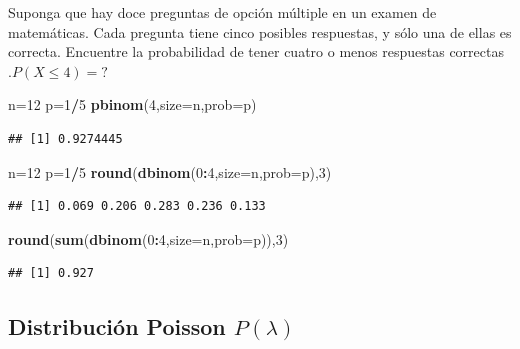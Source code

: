 \documentclass[
  ignorenonframetext,
]{beamer}
\newenvironment{Shaded}{\begin{snugshade}}{\end{snugshade}}
\newcommand{\DataTypeTok}[1]{\textcolor[rgb]{0.13,0.29,0.53}{#1}}
\newcommand{\DecValTok}[1]{\textcolor[rgb]{0.00,0.00,0.81}{#1}}
\newcommand{\KeywordTok}[1]{\textcolor[rgb]{0.13,0.29,0.53}{\textbf{#1}}}
\newcommand{\NormalTok}[1]{#1}
\newcommand{\OperatorTok}[1]{\textcolor[rgb]{0.81,0.36,0.00}{\textbf{#1}}}
\begin{document}
\begin{frame}[fragile]{}

\justifying Suponga que hay doce preguntas de opción múltiple en un
examen de matemáticas. Cada pregunta tiene cinco posibles respuestas, y
sólo una de ellas es correcta. Encuentre la probabilidad de tener cuatro
o menos respuestas correctas .\(P(X\leq 4)=?\)

\begin{Shaded}
\begin{Highlighting}[]
\NormalTok{n=}\DecValTok{12}
\NormalTok{p=}\DecValTok{1}\OperatorTok{/}\DecValTok{5}
\KeywordTok{pbinom}\NormalTok{(}\DecValTok{4}\NormalTok{,}\DataTypeTok{size=}\NormalTok{n,}\DataTypeTok{prob=}\NormalTok{p)}
\end{Highlighting}
\end{Shaded}

\begin{verbatim}
## [1] 0.9274445
\end{verbatim}

\begin{Shaded}
\begin{Highlighting}[]
\NormalTok{n=}\DecValTok{12}
\NormalTok{p=}\DecValTok{1}\OperatorTok{/}\DecValTok{5}
\KeywordTok{round}\NormalTok{(}\KeywordTok{dbinom}\NormalTok{(}\DecValTok{0}\OperatorTok{:}\DecValTok{4}\NormalTok{,}\DataTypeTok{size=}\NormalTok{n,}\DataTypeTok{prob=}\NormalTok{p),}\DecValTok{3}\NormalTok{)}
\end{Highlighting}
\end{Shaded}

\begin{verbatim}
## [1] 0.069 0.206 0.283 0.236 0.133
\end{verbatim}

\begin{Shaded}
\begin{Highlighting}[]
\KeywordTok{round}\NormalTok{(}\KeywordTok{sum}\NormalTok{(}\KeywordTok{dbinom}\NormalTok{(}\DecValTok{0}\OperatorTok{:}\DecValTok{4}\NormalTok{,}\DataTypeTok{size=}\NormalTok{n,}\DataTypeTok{prob=}\NormalTok{p)),}\DecValTok{3}\NormalTok{)}
\end{Highlighting}
\end{Shaded}

\begin{verbatim}
## [1] 0.927
\end{verbatim}

\end{frame}

\hypertarget{distribuciuxf3n-poisson-plambda}{%
\subsection{\texorpdfstring{Distribución Poisson
\(P(\lambda)\)}{Distribución Poisson P(\textbackslash lambda)}}\label{distribuciuxf3n-poisson-plambda}}
\end{document}

